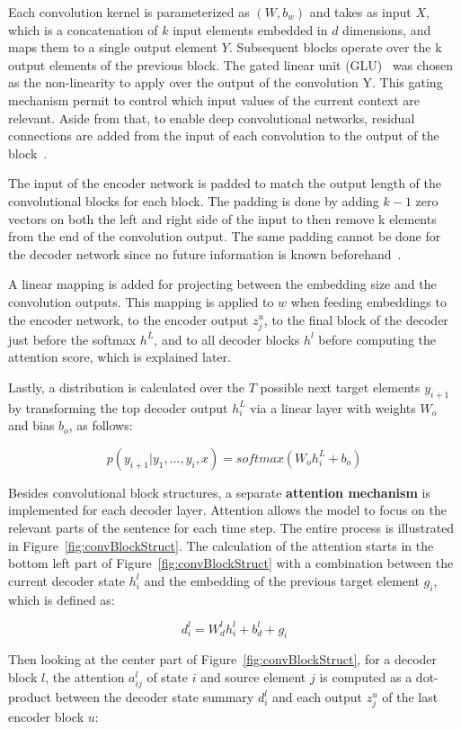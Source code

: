 Each convolution kernel is parameterized as $(W, b_w)$ and takes as input $X$, which is a 
concatenation of $k$ input elements embedded in $d$ dimensions, and maps them to a single 
output element $Y$. Subsequent blocks operate over the k output elements of the previous 
block. The gated linear unit (GLU)~\cite{semPar:DauphinFAG16} was chosen as the non-linearity 
to apply over the output of the convolution Y. This gating mechanism permit to control which 
input values of the current context are relevant. Aside from that, to enable deep convolutional 
networks, residual connections are added from the input of each convolution to the output of the 
block~\cite{semPar:HeZRS15}.

The input of the encoder network is padded to match the output length of the convolutional 
blocks for each block. The padding is done by adding $k - 1$ zero vectors on both the left 
and right side of the input to then remove k elements from the end of the convolution output. 
The same padding cannot be done for the decoder network since no future information is known 
beforehand~\cite{semPar:OordKK16}.

A linear mapping is added for projecting between the embedding size and the convolution 
outputs. This mapping is applied to $w$ when feeding embeddings to the encoder network, to the 
encoder output $z_j^u$, to the final block of the decoder just before the softmax $h^L$, and 
to all decoder blocks $h^l$ before computing the attention score, which is explained later. 

Lastly, a distribution is calculated over the $T$ possible next target elements $y_{i+1}$ by 
transforming the top decoder output $h_i^L$ via a linear layer with weights $W_o$ and bias 
$b_o$, as follows:

\[
    p(y_{i+1}|y_1,\ldots,y_i,x)=softmax(W_o h_i^L + b_o)
\]

Besides convolutional block structures, a separate \textbf{attention mechanism} is implemented 
for each decoder layer. Attention allows the model to focus on the relevant parts of the 
sentence for each time step. The entire process is illustrated in 
Figure~\ref{fig:convBlockStruct}. The calculation of the attention starts in the bottom left 
part of Figure~\ref{fig:convBlockStruct} with a combination between the current decoder state 
$h_i^l$ and the embedding of the previous target element $g_i$, which is defined as:

\[
    d_i^l= W_d^l h_i^l + b_d^l + g_i
\]

Then looking at the center part of Figure~\ref{fig:convBlockStruct}, for a decoder block $l$, 
the attention $a_{ij}^l$ of state $i$ and source element $j$ is computed as a dot-product 
between the decoder state summary $d_i^l$ and each output $z_j^u$ of the last encoder block $u$:

